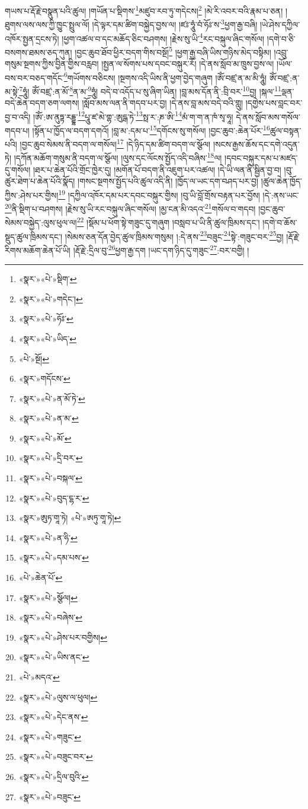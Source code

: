 གཡས་པ་རྡོ་རྗེ་བསྣུན་པའི་ཚུལ། །གཡོན་པ་སྡིགས་\footnote{«སྣར་»«པེ་»སྡིག་}མཛུབ་རབ་ཏུ་གདེངས།\footnote{«སྣར་»«པེ་»གདེང་།} །མེ་རི་འབར་བའི་རྣམ་པ་ཅན། །ཐུགས་ལས་ལས་ཀྱི་ཁྱུང་སྤྲུལ་ལོ། །དེ་ལྟར་དམ་ཚིག་བསྐྱེད་བྱས་ལ། །ཛཿ་ཧཱུཾ་བཾ་ཧོཿ་ས་\footnote{«སྣར་»«པེ་»ཧོཿ་}ཕྱག་རྒྱ་བཞི། །ཡེ་ཤེས་དཀྱིལ་འཁོར་སྤྱན་དྲངས་ཏེ། །ཕྱག་འཚལ་བ་དང་མཆོད་ཅིང་བཤགས། །རྗེས་སུ་ཡི་\footnote{«སྣར་»«པེ་»ཡིད་}རང་བསྐུལ་ཞིང་གསོལ། །དགེ་བ་ཅི་བསགས་ཐམས་ཅད་ཀུན། །བྱང་ཆུབ་ཐོབ་ཕྱིར་བདག་གིས་བསྔོ།\footnote{«པེ་»སྔོ།} །ཕྱག་རྒྱ་བཞི་ཡིས་གཉིས་མེད་བསྟིམ། །འབྲུ་གསུམ་སྔགས་ཀྱིས་བྱིན་གྱིས་བརླབ། །སྤྱན་ལ་སོགས་པས་དབང་བསྐུར་རོ། །དེ་ནས་སློབ་མ་ཁྲུས་བྱས་ལ། །ཡོལ་བས་བར་བཅད་གདོང་\footnote{«སྣར་»གདོངས་}གཡོགས་བཅིངས། །སྔགས་འདི་ཡིས་ནི་ཕྱག་བྱེད་གཞུག །ཨོཾ་བཛྲ་ན་མ་མི་ཧཱུཾ། ཨོཾ་བཛྲ་:ན་མ་སྟེ་\footnote{«སྣར་»«པེ་»ན་མོ་ཏེ་}ཧཱུཾ། ཨོཾ་བཛྲ་:ན་མོ་\footnote{«སྣར་»«པེ་»ན་མ་}ན་མ་\footnote{«སྣར་»«པེ་»མོ་}ཧཱུཾ། བདེ་བ་འདོད་པ་སུ་ཞིག་ཡིན། །བླ་མས་དོན་ནི་:བྲི་བར་\footnote{«སྣར་»«པེ་»དྲི་བར་}བྱ། །སྐལ་\footnote{«སྣར་»«པེ་»བསྐལ་}ལྡན་བདེ་ཆེན་བདག་ཅག་ལགས། །སློབ་མས་ལན་ནི་གདབ་པར་བྱ། །དེ་ནས་བླ་མས་བདེ་བའི་གླུ། །དགྱེས་པས་བླང་བར་བྱ་བ་འདི། །ཨོཾ་:ཨ་ནུཏྟ་རདྡྷ་\footnote{«སྣར་»«པེ་»བུད་ངྷ་ར་}པཱུ་ཛ་མེ་གྷ་:ཨུདྒ་ཏེ་\footnote{«སྣར་»ཨུཏ་གཱ་ཏེ། «པེ་»ཨཏུ་གཱ་ཏེ། }སྥ་ར་:ཎ་ཨི་\footnote{«སྣར་»«པེ་»ན་ཧི་}མཾ་ག་ག་ན་ཁཾ་སྭ་ཧཱ། དེ་ནས་སློབ་མས་གསོལ་གདབ་པ། །སྟོན་པ་ཁྱོད་ལ་བདག་དགའོ། །བླ་མ་:དམ་པ་\footnote{«སྣར་»«པེ་»དམ་པས་}དགོངས་སུ་གསོལ། །བྱང་ཆུབ་:ཆེན་པོར་\footnote{«པེ་»ཆེན་པོ་}ཚུལ་བསྟན་པའི། །བྱང་ཆུབ་སེམས་ནི་བདག་ལ་གསོལ།\footnote{«སྣར་»«པེ་»སྩོལ།} །དེ་ཉིད་དམ་ཚིག་བདག་ལ་སྩོལ། །སངས་རྒྱས་ཆོས་དང་དགེ་འདུན་ཏེ། །དཀོན་མཆོག་གསུམ་ནི་བདག་ལ་སྩོལ། །ལུས་དང་ལོངས་སྤྱོད་འདི་བཞིས་\footnote{«སྣར་»«པེ་»བཞེས་}ལ། །དབང་བསྐུར་དམ་པ་མཛད་དུ་གསོལ། །ཐར་པ་ཆེན་པོའི་གྲོང་ཁྱེར་དུ། །མགོན་པོ་བདག་ནི་འཇུག་པར་འཚལ། །དེ་ཡི་ལན་ནི་སྦྱིན་བྱ་བ། །བུ་ཚུར་ཐེག་པ་ཆེན་པོའི་སྣོད། །གསང་སྔགས་སྤྱོད་པའི་ཚུལ་འདི་ནི། །ཁྱོད་ལ་ཡང་དག་བཤད་པར་བྱ། །ཚུལ་ཆེན་ཁྱོད་ཀྱིས་:ཤེས་པར་གྱིས།\footnote{«སྣར་»«པེ་»ཤེས་པར་བགྱིས།} །དཀྱིལ་འཁོར་དམ་པར་དབང་བསྐུར་གྱིས། །བུ་ཡི་བློ་གྲོས་བརྟན་པར་བྱོས། །དེ་:ནས་ཡང་\footnote{«སྣར་»«པེ་»ཡིས་ནང་}ནི་སྡིག་པ་བཤགས། །རྗེས་སུ་ཡི་རང་བསྐུལ་ཞིང་གསོལ། །མྱ་ངན་མི་འདའ་\footnote{«པེ་»མདའ་}གསོལ་བ་གདབ། །བྱང་ཆུབ་སེམས་བསྐྱེད་:ལུས་ཕུལ་ལ།\footnote{«སྣར་»«པེ་»ལུས་ལ་ཕུལ།} །སྡོམ་པ་ཕོག་སྟེ་གཟུང་དུ་གཞུག །བསླབ་པ་ཡི་ནི་ཚུལ་ཁྲིམས་དང་། །དགེ་བ་ཆོས་སྡུད་ཚུལ་ཁྲིམས་དང་། །སེམས་ཅན་དོན་བྱེད་ཚུལ་ཁྲིམས་གསུམ། །:དེ་ནས་\footnote{«སྣར་»«པེ་»དེང་ནས་}བཟུང་\footnote{«སྣར་»«པེ་»གཟུང་}སྟེ་:གཟུང་བར་\footnote{«སྣར་»«པེ་»བཟུང་བར་}བྱ། །རྡོ་རྗེ་རིགས་མཆོག་ཆེན་པོ་ཡི། །རྡོ་རྗེ་:དྲིལ་བུ་\footnote{«སྣར་»«པེ་»དྲིལ་བུའི་}ཕྱག་རྒྱ་དག །ཡང་དག་ཉིད་དུ་གཟུང་\footnote{«སྣར་»«པེ་»བཟུང་}:བར་བགྱི། །
